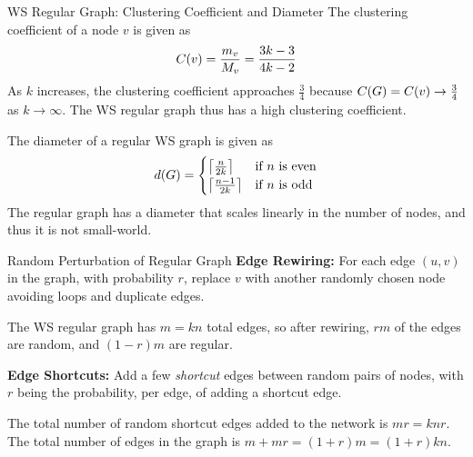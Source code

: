 \begin{frame}{WS Regular Graph: Clustering Coeff\/{i}cient and Diameter}
The clustering coeff\/{i}cient of a node
$v$ is given as
\begin{align*}
    C(v) = {m_v \over M_v} = {3k-3 \over 4k-2}
\end{align*}
As $k$ increases, the clustering
coeff\/{i}cient approaches $\tfrac{3}{4}$ because $C(G) = C(v) \to {3 \over 4}$ as $k \to \infty$.
The WS regular graph thus has a high clustering coeff\/{i}cient.


\medskip
The
diameter of a regular WS graph is given as
\begin{align*}
    d(G) = \begin{cases}
    \left\lceil{n \over 2k}\right\rceil & \text{if $n$ is even}\\
    \left\lceil{n-1 \over 2k}\right\rceil &  \text{if $n$ is odd}
    \end{cases}
\end{align*}
The regular graph has a diameter that scales linearly in the number
of nodes, and thus it is not small-world.
\end{frame}


\begin{frame}{Random Perturbation of Regular Graph}
  \medskip
{\bf Edge Rewiring:}
For each
edge $(u,v)$ in the graph, with probability $r$, replace $v$ with
another randomly chosen node avoiding loops and duplicate
edges. 

\smallskip
The WS regular graph has $m = kn$ total edges, so 
after rewiring, $rm$ of the edges are random, and $(1-r)m$ are regular.

\bigskip
{\bf Edge Shortcuts:}
Add 
a few {\em shortcut} edges between random pairs of nodes, with $r$ being 
the probability, per
edge, of adding a shortcut edge.

\smallskip
The
total number of random shortcut edges added to the network
is $mr = knr$.
The total number of edges in the
graph is $m + mr = (1+r)m = (1+r)kn$. 
\end{frame}


